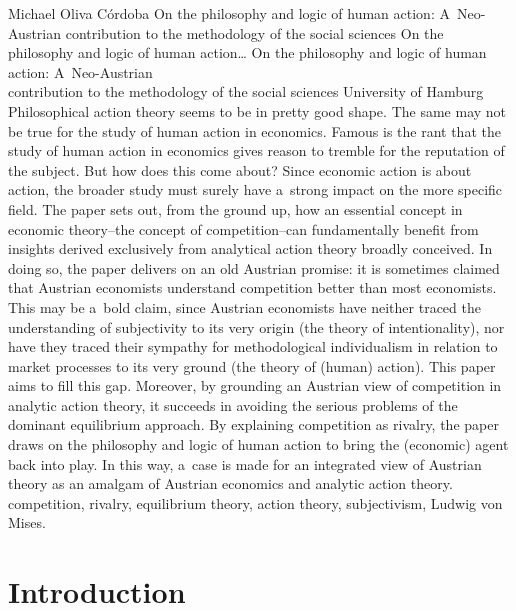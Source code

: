 \begin{artengenv}{Michael Oliva Córdoba}
	{On the philosophy and logic of human action: A~Neo-Austrian contribution to the methodology of the social sciences}
	{On the philosophy and logic of human action\ldots}
	{On the philosophy and logic of human action: A~Neo-Austrian\\contribution to the methodology of the social sciences}
	{
	University of Hamburg\label{oliva-firstpage}}
	{Philosophical action theory seems to be in pretty good shape. The same may not be true for the study of human action in economics. Famous is the rant that the study of human action in economics gives reason to tremble for the reputation of the subject. But how does this come about? Since economic action is about action, the broader study must surely have a~strong impact on the more specific field. The paper sets out, from the ground up, how an essential concept in economic theory–the concept of competition–can fundamentally benefit from insights derived exclusively from analytical action theory broadly conceived. In doing so, the paper delivers on an old Austrian promise: it is sometimes claimed that Austrian economists understand competition better than most economists. This may be a~bold claim, since Austrian economists have neither traced the understanding of subjectivity to its very origin (the theory of intentionality), nor have they traced their sympathy for methodological individualism in relation to market processes to its very ground (the theory of (human) action). This paper aims to fill this gap. Moreover, by grounding an Austrian view of competition in analytic action theory, it succeeds in avoiding the serious problems of the dominant equilibrium approach. By explaining competition as rivalry, the paper draws on the philosophy and logic of human action to bring the (economic) agent back into play. In this way, a~case is made for an integrated view of Austrian theory as an amalgam of Austrian economics and analytic action theory.
	}
	{competition, rivalry, equilibrium theory, action theory, subjectivism, Ludwig von Mises.}




\section{Introduction}


\end{artengenv}
